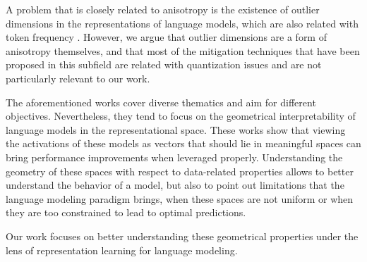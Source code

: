 A problem that is closely related to anisotropy is the existence of outlier dimensions in the representations of language models, which are also related with token frequency \citep{puccetti-etal-2022-outlier}. However, we argue that outlier dimensions are a form of anisotropy themselves, and that most of the mitigation techniques that have been proposed in this subfield are related with quantization issues \citep{ahmadian2023intriguing,nrusimha2024mitigatingimpactoutlierchannels} and are not particularly relevant to our work. 

\vspace{2em}

The aforementioned works cover diverse thematics and aim for different objectives. Nevertheless, they tend to focus on the geometrical interpretability of language models in the representational space. These works show that viewing the activations of these models as vectors that should lie in meaningful spaces can bring performance improvements when leveraged properly. Understanding the geometry of these spaces with respect to data-related properties allows to better understand the behavior of a model, but also to point out limitations that the language modeling paradigm brings, when these spaces are not uniform or when they are too constrained to lead to optimal predictions.


Our work focuses on better understanding these geometrical properties under the lens of representation learning for language modeling. 
